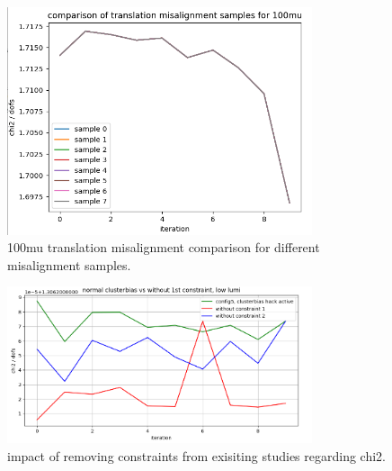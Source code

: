 \begin{figure}
  \centering
  \includegraphics[width=0.8\textwidth]{plots/feb_6_2022/100mu_misalignment_samples_compared.png}
  \caption{100mu translation misalignment comparison for different misalignment samples.}
  \label{fig:100muT}
\end{figure}

\begin{figure}
  \centering
  \includegraphics[width=0.8\textwidth]{plots/feb_6_2022/low_lumi_removed_constraints_vs_normal.png}
  \caption{impact of removing constraints from exisiting studies regarding chi2.}
  \label{fig:removeConst}
\end{figure}

